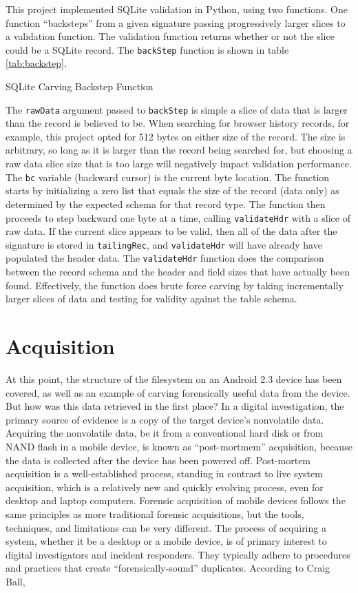 This project implemented SQLite validation in Python, using two functions.  One function ``backsteps'' from a given signature
passing progressively larger slices to a validation function.  The validation function returns whether or not the slice could be a
SQLite record.  The \texttt{backStep} function is shown in table \ref{tab:backstep}. 

\begin{table}

\caption{SQLite Carving Backstep Function}
\label{tab:backstep}
\end{table}

The \texttt{rawData} argument passed to \texttt{backStep} is simple a slice of data that is larger than the record is believed to
be.  When searching for browser history records, for example, this project opted for 512 bytes on either size of the record.  The
size is arbitrary, so long as it is larger than the record being searched for, but choosing a raw data slice size that is too large
will negatively impact validation performance.  The \texttt{bc} variable (backward cursor) is the current byte location.  The
function starts by initializing a zero list that equals the size of the record (data only) as determined by the expected schema for
that record type.  The function then proceeds to step backward one byte at a time, calling \texttt{validateHdr} with a slice of raw
data.  If the current slice appears to be valid, then all of the data after the signature is stored in \texttt{tailingRec}, and
\texttt{validateHdr} will have already have populated the header data.  The \texttt{validateHdr} function does the comparison
between the record schema and the header and field sizes that have actually been found.  Effectively, the function does brute force
carving by taking incrementally larger slices of data and testing for validity against the table schema.

\section{Acquisition}
At this point, the structure of the filesystem on an Android 2.3 device has been covered, as well as an example of carving
forensically useful data from the device. But how was this data retrieved in the first place? In a digital investigation, the
primary source of evidence is a copy of the target device's nonvolatile data.  Acquiring the nonvolatile data, be it from a
conventional hard disk or from NAND flash in a mobile device, is known as ``post-mortmem'' acquisition, because the data is
collected after the device has been powered off.  Post-mortem acquisition is a well-established process, standing in contrast to
live system acquisition, which is a relatively new and quickly evolving process, even for desktop and laptop computers.  Forensic
acquisition of mobile devices follows the same principles as more traditional forensic acquisitions, but the tools, techniques, and
limitations can be very different. The process of acquiring a system, whether it be a desktop or a mobile device, is of primary
interest to digital investigators and incident responders. They typically adhere to procedures and practices that create
``forensically-sound'' duplicates.  According to Craig Ball, 

